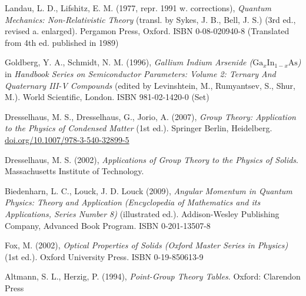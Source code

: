 \documentclass[12pt]{article}
\begin{document}
\begin{thebibliography}{10}
Landau, L. D., Lifshitz, E. M. (1977, repr. 1991 w. corrections), \textit{Quantum Mechanics: Non-Relativistic Theory} (transl. by Sykes, J. B., Bell, J. S.) (3rd ed., revised a. enlarged). Pergamon Press, Oxford. ISBN 0-08-020940-8 (Translated from 4th ed. published in 1989)

Goldberg, Y. A., Schmidt, N. M. (1996), \textit{Gallium Indium Arsenide ($\text{Ga}_{x}\text{In}_{1-x}\text{As}$)} in \textit{Handbook Series on Semiconductor Parameters: Volume 2: Ternary And Quaternary III-V Compounds} (edited by Levinshtein, M., Rumyantsev, S., Shur, M.). World Scientific, London. ISBN  981-02-1420-0 (Set)

Dresselhaus, M. S., Dresselhaus, G., Jorio, A. (2007), \textit{Group Theory: Application to the Physics of Condensed Matter} (1st ed.). Springer Berlin, Heidelberg. \href{https://doi.org/10.1007/978-3-540-32899-5}{doi.org/10.1007/978-3-540-32899-5}

Dresselhaus, M. S. (2002), \textit{Applications of Group Theory to the Physics of Solids}. Massachusetts Institute of Technology.

Biedenharn, L. C., Louck, J. D. Louck (2009), \textit{Angular Momentum in Quantum Physics: Theory and Application (Encyclopedia of Mathematics and its Applications, Series Number 8)} (illustrated ed.). Addison-Wesley Publishing Company, Advanced Book Program. ISBN 0-201-13507-8

Fox, M. (2002), \textit{Optical Properties of Solids (Oxford Master Series in Physics)} (1st ed.). Oxford University Press. ISBN 0-19-850613-9

Altmann, S. L., Herzig, P. (1994), \textit{Point-Group Theory Tables}. Oxford: Clarendon Press

\end{thebibliography}



%





\end{document}
